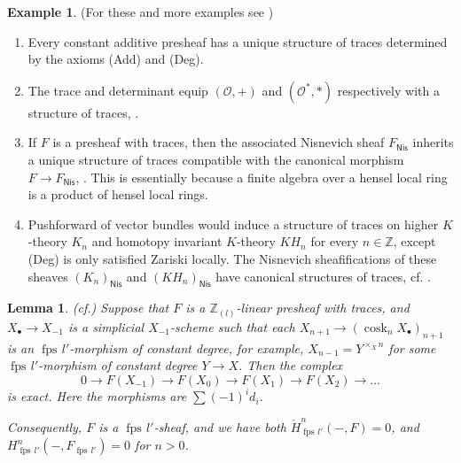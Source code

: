 \documentclass[10pt]{amsart}
\newtheorem{lemm}[theo]{Lemma}
\theoremstyle{definition}
\newtheorem{exam}[theo]{Example}
\newcommand{\OO}{\mathcal{O}}
\newcommand{\ZZ}{\mathbb{Z}}
\newcommand{\zll}{\mathbb{Z}_{(l)}}
\DeclareMathOperator{\cosk}{cosk}
\newcommand{\Nis}{\mathsf{Nis}}
\newcommand{\fpsl}{{\operatorname{fps\!}l'}}
\newcommand{\cdh}{{{\operatorname{cdh}}}}
\newcommand{\uh}{\operatorname{uh}}
\begin{document}
\begin{exam} \label{exam:traces} {({For these and more examples see \cite[Exam.2.1.4]{Kel17}})}\ 
\begin{enumerate}
 \item \label{exam:traces:const} Every constant additive presheaf has a unique structure of traces determined by the axioms (Add) and (Deg).
 
 \item The trace and determinant equip $(\OO, +)$ and $(\OO^*, *)$ respectively with a structure of traces, \cite[Exam.2.1.4(vii)]{Kel17}.

 \item If $F$ is a presheaf with traces, then the associated Nisnevich sheaf $F_{\Nis}$ inherits a unique structure of traces compatible with the canonical morphism $F \to F_{\Nis}$, \cite[Cor.2.1.13]{Kel17}. This is essentially because a finite algebra over a hensel local ring is a product of hensel local rings.

 \item Pushforward of vector bundles would induce a structure of traces on higher $K$-theory $K_n$ and homotopy invariant $K$-theory $KH_n$ for every $n \in \ZZ$, except (Deg) is only satisfied Zariski locally. The Nisnevich sheafifications of these sheaves $(K_n)_{\Nis}$ and $(KH_n)_{\Nis}$ have canonical structures of traces, cf. \cite[Proof of Lem.3.1]{Kel14}.
%
\end{enumerate}
\end{exam}

\begin{lemm}{({cf.\cite[Lemma 2.1.8]{Kel17}})} \label{lemm:hcVanish}
Suppose that $F$ is a $\zll$-linear presheaf with traces, and $X_\bullet \to X_{-1}$ is a simplicial $X_{-1}$-scheme such that each $X_{n+1} \to (\cosk_n X_\bullet)_{n+1}$ is an $\fpsl$-morphism of constant degree, for example, $X_{n-1} = Y^{\times_X n}$ for some $\fpsl$-morphism of constant degree $Y \to X$. Then the complex
\[ 0 \to F(X_{-1}) \to F(X_0) \to F(X_1) \to F(X_2) \to \dots \]
is exact. Here the morphisms are $\sum (-1)^i d_i$.

Consequently, $F$ is a $\fpsl$-sheaf, and we have both $\check{H}^n_{\fpsl}(-, F) = 0$, and $H^n_{\fpsl}(-, F_{\fpsl}) = 0$ for $n > 0$.
\end{lemm}
\end{document}
